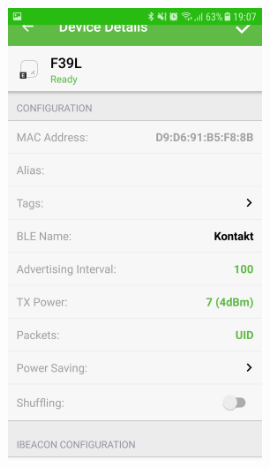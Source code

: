 \documentclass[mathserif]{beamer}
\begin{document}
\begin{frame}
\begin{columns}[t]
\begin{figure}
\includegraphics[width=0.6\textwidth]{../figures/kontaktapp2.png}
\end{figure}

\end{columns}
\end{frame}
\end{document}
